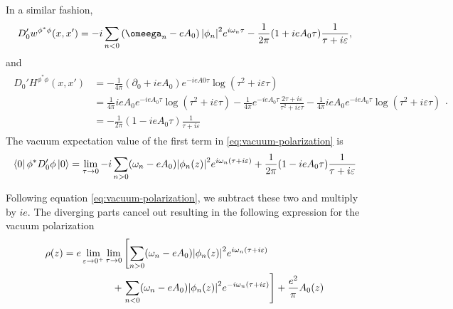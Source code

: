 In a similar fashion, 
\begin{align}
	D_0'w^{\phi^* \phi}(x, x') = -i \sum_{n<0}^{} \left( \omeega_n  -eA_0 \right) \abs{\phi_n}^2 e^{i\omega_n \tau}-\frac{1}{2\pi}(1+ieA_0\tau) \frac{1}{\tau + i\varepsilon},
\end{align}
and 
\begin{align}
	\begin{split}
			D_0'H^{\phi^* \phi}(x, x')&= -\frac{1}{4\pi} (\partial_0+ ieA_0)e^{-ieA0\tau} \log\left( \tau^2 + i\varepsilon \tau \right) \\
			&= \frac{1}{4\pi} ieA_0 e^{-ieA_0 \tau} \log(\tau^2+i\varepsilon \tau) 
		-\frac{1}{4\pi} e^{-ieA_0 \tau} \frac{2\tau +i \varepsilon }{\tau^2+i\varepsilon\tau} - \frac{1}{4\pi} ieA_0e^{-ieA_0\tau} \log(\tau^2+i\varepsilon \tau)\\
		&= -\frac{1}{2\pi}(1-ieA_0\tau) \frac{1}{\tau + i\varepsilon} 
	\end{split}.
\end{align}
The vacuum expectation value of the first term in \eqref{eq:vacuum-polarization} is 
\begin{align}
	\bra{0}\phi^* D_0'\phi\ket{0} = \lim_{\tau \to 0} -i\sum_{n>0}^{} (\omega_n - eA_0)\abs{\phi_n(z)}^2 e^{i\omega_n (\tau+ i \varepsilon)} + \frac{1}{2\pi}(1-ieA_0\tau) \frac{1}{\tau + i\varepsilon} 
\end{align}

Following equation \eqref{eq:vacuum-polarization}, we subtract these two and multiply by $ie$. The diverging parts cancel out resulting in the following expression for the vacuum polarization
\begin{align}
	\begin{split}
		\rho(z)	 = e\lim_{\varepsilon \to 0^+} \lim_{\tau \to 0}  &\left[  \sum_{n>0}^{} (\omega_n - eA_0)\abs{\phi_n(z)}^2 e^{i\omega_n (\tau+ i \varepsilon)} \right. \\
			   +& \left.  \sum_{n<0}^{} (\omega_n - eA_0)\abs{\phi_n(z)}^2 e^{-i\omega_n (\tau+ i \varepsilon)} \right]  + \frac{e^2}{\pi}A_0(z)\\
	\end{split}
\end{align}
